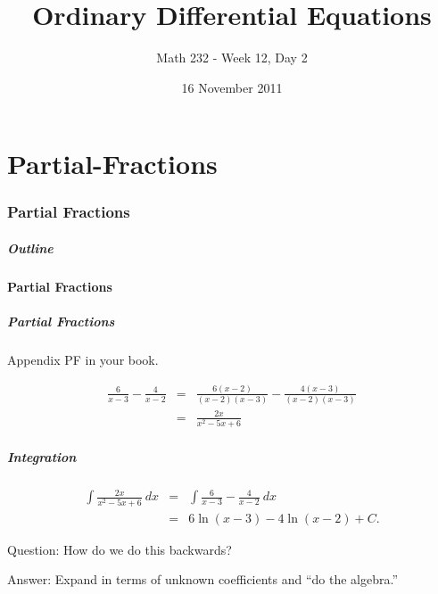 \part{Partial-Fractions}
\section{Partial Fractions}


\title{Ordinary Differential Equations}
\subtitle{Math 232 - Week 12, Day 2}
\date{16 November 2011}

\begin{frame}
  \titlepage
\end{frame}

\begin{frame}
  \frametitle{Outline}
\end{frame}


\subsection{Partial Fractions}


\begin{frame}
  \frametitle{Partial Fractions}

  Appendix PF in your book.

  {
    \begin{eqnarray*}
      \frac{6}{x-3} - \frac{4}{x-2} & = & \frac{6(x-2)}{(x-2)(x-3)} - \frac{4(x-3)}{(x-2)(x-3)}\\
      & = & \frac{2x}{x^2-5x+6}
    \end{eqnarray*}
  }

\end{frame}


\begin{frame}
  \frametitle{Integration}

  \begin{eqnarray*}
    \int \frac{2x}{x^2-5x+6} ~ dx & = & \int \frac{6}{x-3} - \frac{4}{x-2} ~ dx \\
    & = & 6\ln(x-3) - 4\ln(x-2) + C.
  \end{eqnarray*}

  {
    Question: How do we do this backwards?

    Answer: Expand in terms of unknown coefficients and ``do the algebra.''
  }

\end{frame}



